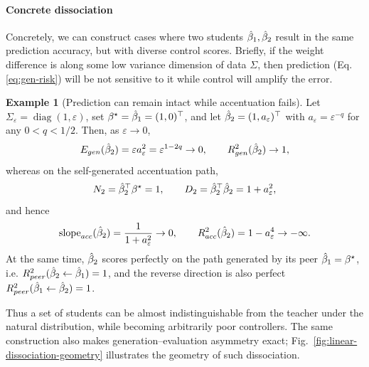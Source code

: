\documentclass{article}
\providecommand{\examplename}{Example}
\theoremstyle{plain}
\theoremstyle{definition}
\newtheorem{example}[thm]{\examplename}
\theoremstyle{remark}
\begin{document}
\paragraph{Concrete dissociation}
Concretely, we can construct cases where
two students $\hat{\beta}_{1},\hat{\beta}_{2}$ result in the same prediction accuracy, 
but with diverse control scores. 
Briefly, if the weight difference is along some low variance dimension of
data $\Sigma$, then prediction (Eq.\ref{eq:gen-risk}) will be not sensitive to it while
control will amplify the error.

{
\begin{example}[Prediction can remain intact while accentuation fails]\label{ex:toy-separation-tentative}
Let $\Sigma_\varepsilon=\operatorname{diag}(1,\varepsilon)$, set ${\beta^{\star}}=\hat{\beta}_1=(1,0)^\top$, and let $\hat{\beta}_2=(1,a_\varepsilon)^\top$ with $a_\varepsilon=\varepsilon^{-q}$ for any $0<q<1/2$.
Then, as $\varepsilon\to0$,
\begin{equation}
E_{gen}(\hat{\beta}_2)=\varepsilon a_\varepsilon^2=\varepsilon^{1-2q}\to0,
\qquad R_{gen}^2(\hat{\beta}_2)\to1,
\end{equation}
whereas on the self-generated accentuation path,
\begin{equation}
N_2={\hat{\beta}_2}^{\top}{\beta^{\star}}=1,\qquad
D_2={\hat{\beta}_2}^{\top}\hat{\beta}_2=1+a_\varepsilon^2,
\end{equation}
and hence
\begin{equation}
\mathrm{slope}_{acc}(\hat{\beta}_2)=\frac{1}{1+a_\varepsilon^2}\to0,
\qquad
R_{acc}^2(\hat{\beta}_2)=1-a_\varepsilon^4\to-\infty.
\end{equation}
At the same time, $\hat{\beta}_2$ scores perfectly on the path generated by its peer $\hat{\beta}_1={\beta^{\star}}$, i.e. $R_{peer}^2(\hat{\beta}_2\leftarrow\hat{\beta}_1)=1$, 
and the reverse direction is also perfect $R_{peer}^2(\hat{\beta}_1\leftarrow\hat{\beta}_2)=1$. 
\end{example}
}
Thus a set of students can be almost indistinguishable from the teacher under the natural distribution, while becoming arbitrarily poor controllers. The same construction also makes generation--evaluation asymmetry exact; Fig.~\ref{fig:linear-dissociation-geometry} illustrates the geometry of such dissociation.%
\end{document}
